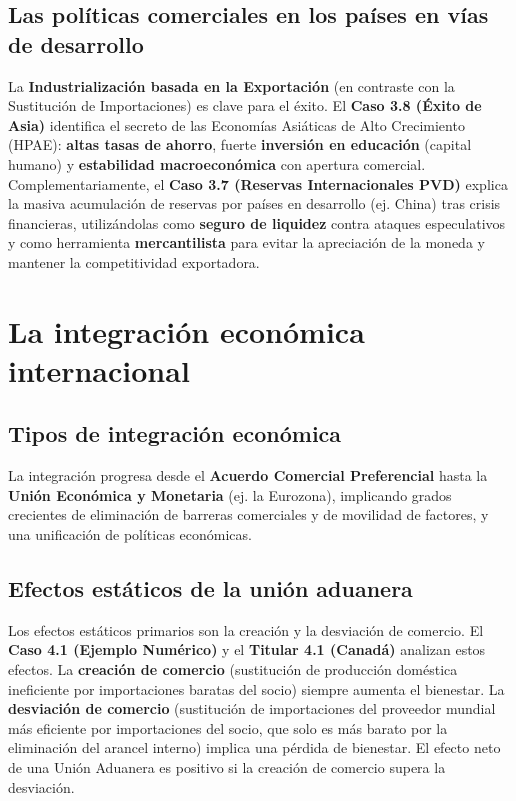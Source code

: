 \subsection{Las políticas comerciales en los países en vías de desarrollo}
La \textbf{Industrialización basada en la Exportación} (en contraste con la Sustitución de Importaciones) es clave para el éxito. El \textbf{Caso 3.8 (Éxito de Asia)} identifica el secreto de las Economías Asiáticas de Alto Crecimiento (HPAE): \textbf{altas tasas de ahorro}, fuerte \textbf{inversión en educación} (capital humano) y \textbf{estabilidad macroeconómica} con apertura comercial. Complementariamente, el \textbf{Caso 3.7 (Reservas Internacionales PVD)} explica la masiva acumulación de reservas por países en desarrollo (ej. China) tras crisis financieras, utilizándolas como \textbf{seguro de liquidez} contra ataques especulativos y como herramienta \textbf{mercantilista} para evitar la apreciación de la moneda y mantener la competitividad exportadora.

\section{La integración económica internacional}

\subsection{Tipos de integración económica}
La integración progresa desde el \textbf{Acuerdo Comercial Preferencial} hasta la \textbf{Unión Económica y Monetaria} (ej. la Eurozona), implicando grados crecientes de eliminación de barreras comerciales y de movilidad de factores, y una unificación de políticas económicas.

\subsection{Efectos estáticos de la unión aduanera}
Los efectos estáticos primarios son la creación y la desviación de comercio. El \textbf{Caso 4.1 (Ejemplo Numérico)} y el \textbf{Titular 4.1 (Canadá)} analizan estos efectos. La \textbf{creación de comercio} (sustitución de producción doméstica ineficiente por importaciones baratas del socio) siempre aumenta el bienestar. La \textbf{desviación de comercio} (sustitución de importaciones del proveedor mundial más eficiente por importaciones del socio, que solo es más barato por la eliminación del arancel interno) implica una pérdida de bienestar. El efecto neto de una Unión Aduanera es positivo si la creación de comercio supera la desviación.

